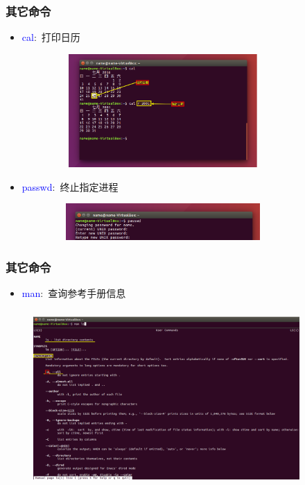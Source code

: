 \frame
{
	\frametitle{其它命令}
	\begin{itemize}
\setlength{\itemsep}{-5pt}
		\item \textcolor{blue}{cal}:~打印日历
\begin{figure}[h!]
\centering
\vspace{-5.5pt}
\includegraphics[height=1.7in,width=3.4in,viewport=0 110 700 480,clip]{Figures/Ubuntu-cal.png}
\label{Linux-command-cal}
\end{figure}
		\item \textcolor{blue}{passwd}:~终止指定进程
\begin{figure}[h!]
\centering
\vspace{-5.5pt}
\includegraphics[height=0.55in,width=3.4in,viewport=0 0 700 120,clip]{Figures/Ubuntu-passwd.png}
\label{Linux-command-passwd}
\end{figure}
\end{itemize}
}

\frame
{
	\frametitle{其它命令}
	\begin{itemize}
		\item \textcolor{blue}{man}:~查询参考手册信息
	\end{itemize}
\begin{figure}[h!]
\centering
\vspace{-7.5pt}
\includegraphics[height=2.65in,width=4.0in,viewport=0 0 1410 860,clip]{Figures/Ubuntu-man.png}
\label{Linux-command-man}
\end{figure}
}


